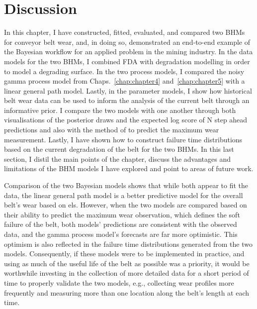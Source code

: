 \section{Discussion} \label{sec:belt-wear-discussion}

In this chapter, I have constructed, fitted, evaluated, and compared two BHMs for conveyor belt wear, and, in doing so, demonstrated an end-to-end example of the Bayesian workflow for an applied problem in the mining industry. In the data models for the two BHMs, I combined FDA with degradation modelling in order to model a degrading surface. In the two process models, I compared the noisy gamma process model from Chaps.~\ref{chap:chapter4} and~\ref{chap:chapter5} with a linear general path model. Lastly, in the parameter models, I show how historical belt wear data can be used to inform the analysis of the current belt through an informative prior. I compare the two models with one another through both visualisations of the posterior draws and the expected log score of N step ahead predictions and also with the method of \citet{webb_2020} to predict the maximum wear measurement. Lastly, I have shown how to construct failure time distributions based on the current degradation of the belt for the two BHMs. In this last section, I distil the main points of the chapter, discuss the advantages and limitations of the BHM models I have explored and point to areas of future work.

Comparison of the two Bayesian models shows that while both appear to fit the data, the linear general path model is a better predictive model for the overall belt's wear based on els. However, when the two models are compared based on their ability to predict the maximum wear observation, which defines the soft failure of the belt, both models' predictions are consistent with the observed data, and the gamma process model's forecasts are far more optimistic. This optimism is also reflected in the failure time distributions generated from the two models. Consequently, if these models were to be implemented in practice, and using as much of the useful life of the belt as possible was a priority, it would be worthwhile investing in the collection of more detailed data for a short period of time to properly validate the two models, e.g., collecting wear profiles more frequently and measuring more than one location along the belt's length at each time.

